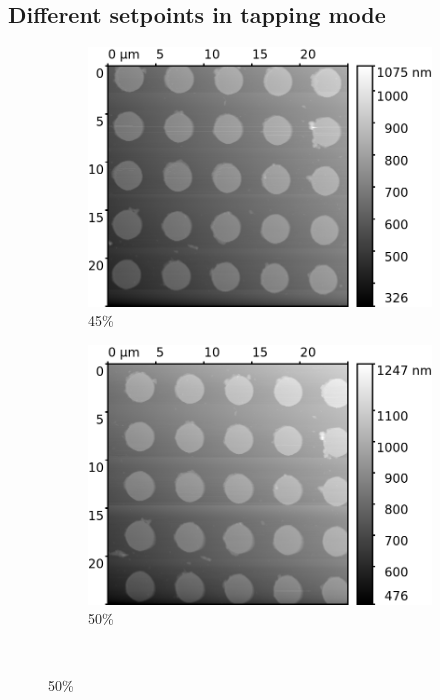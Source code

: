 \documentclass[11pt,a4paper]{article}
\begin{document}
\begin{appendices}
\section{Different setpoints in tapping mode}\label{app:tapping_mode_setpoint}

\begin{figure}[H]
\centering
\begin{subfigure}[b]{0.48\textwidth}
\includegraphics[width=\textwidth]{tapping_mode_setpoint_45}
\caption{45\%}
\end{subfigure}
\begin{subfigure}[b]{0.48\textwidth}
\includegraphics[width=\textwidth]{tapping_mode_setpoint_50}
\caption{50\%}
\end{subfigure}\\\vspace{.2cm}

\end{figure}
\end{appendices}
\end{document}
